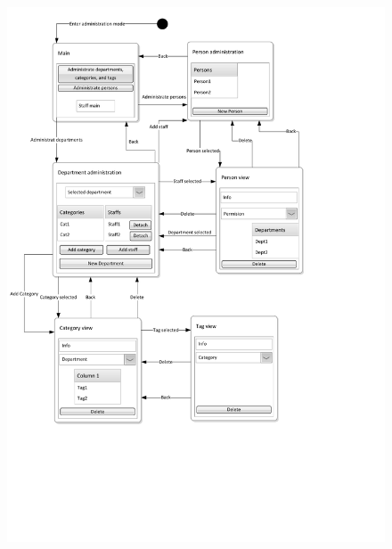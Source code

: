 \begin{figure}[H]
	\centering
		\includegraphics[width = \textwidth, clip=true, trim=0 5cm 3cm 0]{input/application_domain_analysis/Navigation_DiagramAdmin.pdf}
	\morscaption{\ainterface[c]}
	\label{fig:Navigation_DiagramStaff}
\end{figure}

